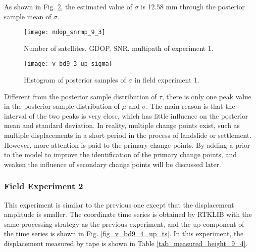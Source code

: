 \documentclass[final,3p,times]{elsarticle}
\begin{document}
	
	As shown in Fig. \ref{fig_v_bd9_3_up_sigma}, the estimated value of $\sigma$ is 12.58 mm through the posterior sample mean of $\sigma$.
	\begin{figure}[htbp]
		\centering
		\texttt{[image: ndop\_snrmp\_9\_3]}
		\caption{Number of satellites, GDOP, SNR, multipath of experiment 1.}
		\label{fig_v_ndop_snrmp_9_3}
	\end{figure} 
	\begin{figure}[htbp]
		\centering
		\texttt{[image: v\_bd9\_3\_up\_sigma]}
		\caption{Histogram of posterior \textcolor{r_s}{samples} of $\sigma$ in field experiment 1.}
		\label{fig_v_bd9_3_up_sigma}
	\end{figure} 
	Different from the posterior sample distribution of $\tau$, there is only one peak value in the posterior sample distribution of $\mu$ and $\sigma$.
	The main reason is that the interval of the two peaks is very close, which has little influence on the posterior mean and standard deviation.
	In reality, multiple change points exist, such as multiple displacements in a short period in the process of landslide or settlement.
	However, more attention is paid to the primary change points.
	By adding a prior to the model to improve the identification of the primary change points, and weaken the influence of secondary change points will be discussed later.
	\subsubsection{Field Experiment 2}%
	This experiment is similar to the previous one except that the displacement amplitude is smaller. 
	The coordinate time series is obtained by RTKLIB with the same processing strategy as the previous experiment, and the up component of the time series is shown in Fig. \ref{fig_v_bd9_4_up_ts}. 
	In this experiment, the displacement measured by tape is shown in Table \ref{tab_measured_height_9_4}.
	
\end{document}
